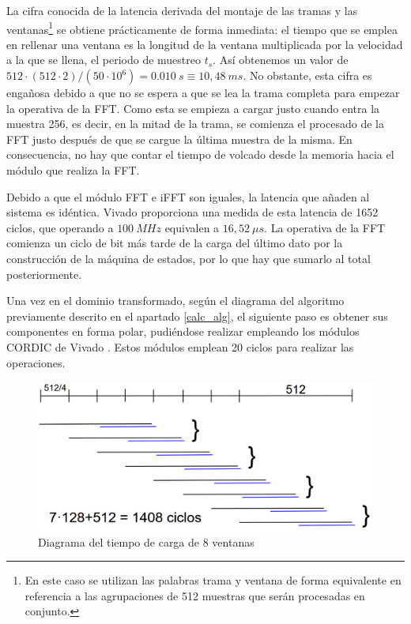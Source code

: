 La cifra conocida de la latencia derivada del montaje de las tramas y las ventanas\footnote{En este caso se utilizan las palabras trama y ventana de forma equivalente en referencia a las agrupaciones de 512 muestras que serán procesadas en conjunto.} se obtiene prácticamente de forma inmediata: el tiempo que se emplea en rellenar una ventana es la longitud de la ventana multiplicada por la velocidad a la que se llena, el periodo de muestreo $t_{s}$. Así obtenemos un valor de $512 \cdot (512 \cdot 2)/(50\cdot10^{6})  = 0.010~s \equiv 10,48~ms$. No obstante, esta cifra es engañosa debido a que no se espera a que se lea la trama completa para empezar la operativa de la FFT. Como esta se empieza a cargar justo cuando entra la muestra 256, es decir, en la mitad de la trama, se comienza el procesado de la FFT justo después de que se cargue la última muestra de la misma. En consecuencia, no hay que contar el tiempo de volcado desde la memoria hacia el módulo que realiza la FFT.

Debido a que el módulo FFT e iFFT son iguales, la latencia que añaden al sistema es idéntica. Vivado proporciona una medida de esta latencia de 1652 ciclos, que operando a $100~MHz$ equivalen a $16,52~\mu s$. La operativa de la FFT comienza un ciclo de bit más tarde de la carga del último dato por la construcción de la máquina de estados, por lo que hay que sumarlo al total posteriormente.

Una vez en el dominio transformado, según el diagrama del algoritmo previamente descrito en el apartado \ref{calc_alg}, el siguiente paso es obtener sus componentes en forma polar, pudiéndose realizar empleando los módulos CORDIC de Vivado \cite{cordicdoc}. Estos módulos emplean 20 ciclos para realizar las operaciones. 

\begin{figure}[!bht]
\begin{center}
\includegraphics[width=15cm]{img/estimacionlat.png}
\caption{\label{fig:estlat}Diagrama del tiempo de carga de 8 ventanas}
\end{center}
\end{figure}


